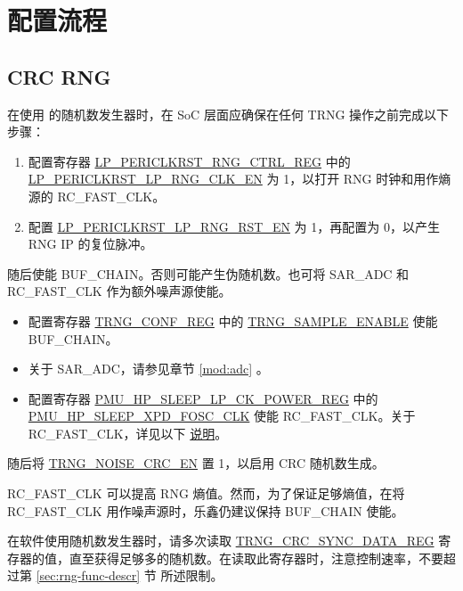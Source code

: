 \documentclass[main\_\_CN.tex]{subfiles}
\begin{document}
\section{配置流程}\label{sec:rng-programm-descr}


\subsection{CRC RNG}

在使用 \chipname{} 的随机数发生器时，在 SoC 层面应确保在任何 TRNG 操作之前完成以下步骤：

\begin{enumerate}
    \item 配置寄存器 \hyperref[regdesc:LPPERICLKRSTRNGCTRLREG]{LP\_PERICLKRST\_RNG\_CTRL\_REG} 中的 \hyperref[fielddesc:LPPERICLKRSTLPRNGCKEN]{LP\_PERICLKRST\_LP\_RNG\_CLK\_EN} 为 1，以打开 RNG 时钟和用作熵源的 RC\_FAST\_CLK。
    \item 配置 \hyperref[fielddesc:LPPERICLKRSTLPRNGRSTEN]{LP\_PERICLKRST\_LP\_RNG\_RST\_EN} 为 1，再配置为 0，以产生 RNG IP 的复位脉冲。
\end{enumerate}

随后使能 BUF\_CHAIN。否则可能产生伪随机数。也可将 SAR\_ADC 和 RC\_FAST\_CLK 作为额外噪声源使能。
\begin{itemize}
    \item 配置寄存器 \hyperref[regdesc:TRNGCONFREG]{TRNG\_CONF\_REG} 中的 \hyperref[fielddesc:TRNGSAMPLEENABLE]{TRNG\_SAMPLE\_ENABLE} 使能 BUF\_CHAIN。
    \item 关于 SAR\_ADC，请参见章节 \ref{mod:adc} \textit{}。
    \item 配置寄存器 \hyperref[regdesc:PMUHPSLEEPLPCKPOWERREG]{PMU\_HP\_SLEEP\_LP\_CK\_POWER\_REG} 中的 \hyperref[fielddesc:PMUHPSLEEPXPDFOSCCLK]{PMU\_HP\_SLEEP\_XPD\_FOSC\_CLK} 使能 RC\_FAST\_CLK。关于 RC\_FAST\_CLK，详见以下 \hyperref[others:rng-note-clock-seed]{说明}。
\end{itemize}

随后将 \hyperref[fielddesc:TRNGNOISECRCEN]{TRNG\_NOISE\_CRC\_EN} 置 1，以启用 CRC 随机数生成。

\begin{tiplisting}
    \label{others:rng-note-clock-seed}
    RC\_FAST\_CLK 可以提高 RNG 熵值。然而，为了保证足够熵值，在将 RC\_FAST\_CLK 用作噪声源时，乐鑫仍建议保持 BUF\_CHAIN 使能。
\end{tiplisting}

在软件使用随机数发生器时，请多次读取 \hyperref[regdesc:TRNGCRCSYNCDATAREG]{TRNG\_CRC\_SYNC\_DATA\_REG} 寄存器的值，直至获得足够多的随机数。在读取此寄存器时，注意控制速率，不要超过第 \ref{sec:rng-func-descr} 节 \textit{} 所述限制。
\end{document}
